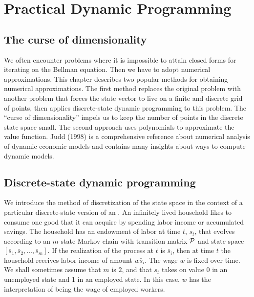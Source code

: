 
%

%
%





\def\toone{{t+1}}
\def\ttwo{{t+2}}
\def\tthree{{t+3}}
\def\Tone{{T+1}}
\def\TTT{{T-1}}
\def\rtr{{\rm tr}}

\chapter{Practical Dynamic Programming \label{practical}}
\section{The curse of dimensionality}
We often encounter problems where
it is impossible
to attain closed forms for iterating on the
Bellman equation.  Then we have to adopt  numerical
approximations.  This chapter  describes two
popular methods for obtaining numerical approximations.  The first
method replaces the original problem with another problem
that forces the state vector to live on a finite and
discrete grid of points, then applies discrete-state dynamic
programming to this problem.  The ``curse of dimensionality''
impels us to keep the number of points in the discrete state
space small.  The second approach uses polynomials to approximate
the value function.  Judd (1998) is   a comprehensive reference
about numerical analysis of dynamic economic models and contains
many insights about ways to compute  dynamic models.

\section{Discrete-state dynamic programming}

We introduce the method of discretization of the state
space  in the context of a particular
discrete-state version of an .  An
infinitely lived household likes to consume one good that
it can acquire by spending labor income or accumulated savings.
The household has an endowment of labor at time $t$, $s_t$, that
evolves according to an $m$-state  Markov chain with transition
matrix $\cal P$ and state space $[\bar s_1, \bar s_2, \ldots, \bar s_m]$.
  If the  realization of the process at $t$ is
$\bar s_i$, then at time $t$ the household receives labor income
of amount $w \bar s_i$.  The wage $w$ is fixed over time.
We shall sometimes assume that $m$ is $2$, and that $s_t$
takes on value  0 in an unemployed state and 1 in an
employed state.  In this case, $w$ has the interpretation of
being the wage of employed workers.

